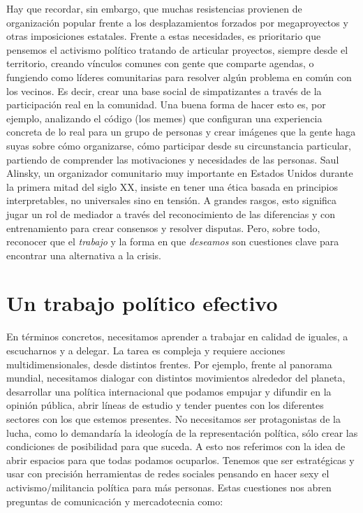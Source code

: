 Hay que recordar, sin embargo, que muchas resistencias provienen de organización popular frente a los desplazamientos forzados por megaproyectos y otras imposiciones estatales. Frente a estas necesidades, es prioritario que pensemos el activismo político tratando de articular proyectos, siempre desde el territorio, creando vínculos comunes con gente que comparte agendas, o fungiendo como líderes comunitarias para resolver algún problema en común con los vecinos. Es decir, crear una base social de simpatizantes a través de la participación real en la comunidad. Una buena forma de hacer esto es, por ejemplo, analizando el código (los memes) que configuran una experiencia concreta de lo real para un grupo de personas y crear imágenes que la gente haga suyas sobre cómo organizarse, cómo participar desde su circunstancia particular, partiendo de comprender las motivaciones y necesidades de las personas. Saul Alinsky, un organizador comunitario muy importante en Estados Unidos durante la primera mitad del siglo XX, insiste en tener una ética basada en principios interpretables, no universales sino en tensión. A grandes rasgos, esto significa jugar un rol de mediador a través del reconocimiento de las diferencias y con entrenamiento para crear consensos y resolver disputas. Pero, sobre todo, reconocer que el \emph{trabajo} y la forma en que \emph{deseamos} son cuestiones clave para encontrar una alternativa a la crisis.

\section{Un trabajo político efectivo}
\label{sec:org0d34f13}

En términos concretos, necesitamos aprender a trabajar en calidad de iguales, a escucharnos y a delegar. La tarea es compleja y requiere acciones multidimensionales, desde distintos frentes. Por ejemplo, frente al panorama mundial, necesitamos dialogar con distintos movimientos alrededor del planeta, desarrollar una política internacional que podamos empujar y difundir en la opinión pública, abrir líneas de estudio y tender puentes con los diferentes sectores con los que estemos presentes. No necesitamos ser protagonistas de la lucha, como lo demandaría la ideología de la representación política, sólo crear las condiciones de posibilidad para que suceda. A esto nos referimos con la idea de abrir espacios para que todas podamos ocuparlos. Tenemos que ser estratégicas y usar con precisión herramientas de redes sociales pensando en hacer sexy el activismo/militancia política para más personas. Estas cuestiones nos abren preguntas de comunicación y mercadotecnia como:

